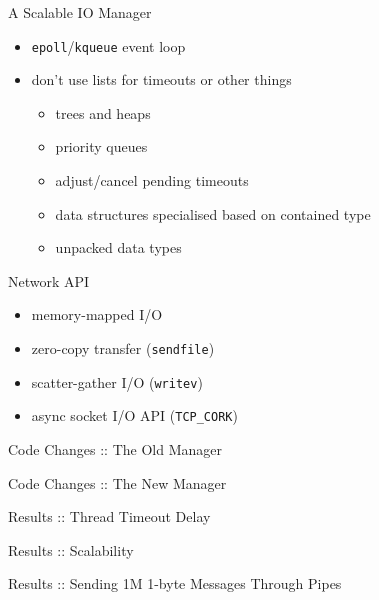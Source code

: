 \documentclass{beamer}
\begin{document}
\begin{frame}{A Scalable IO Manager}
  \begin{itemize}
    \item \texttt{epoll}/\texttt{kqueue} event loop
    \item don't use lists for timeouts or other things
    \begin{itemize}[<+->]
      \item trees and heaps
      \item priority queues
      \item adjust/cancel pending timeouts
      \item data structures specialised based on contained type
      \item unpacked data types
    \end{itemize}
  \end{itemize}
\end{frame}

\begin{frame}{Network API}
  \begin{itemize}
    \item memory-mapped I/O
    \item zero-copy transfer (\texttt{sendfile})
    \item scatter-gather I/O (\texttt{writev})
    \item async socket I/O API (\texttt{TCP\_CORK})
  \end{itemize}
\end{frame}

\begin{frame}{Code Changes :: The Old Manager}
  \centering
\end{frame}

\begin{frame}[label=new]{Code Changes :: The New Manager}
  \centering
\end{frame}

\begin{frame}{Results :: Thread Timeout Delay}
  \centering
\end{frame}

\begin{frame}{Results :: Scalability}
  \centering
\end{frame}

\begin{frame}{Results :: Sending 1M 1-byte Messages Through Pipes}
  \centering
\end{frame}
\end{document}
